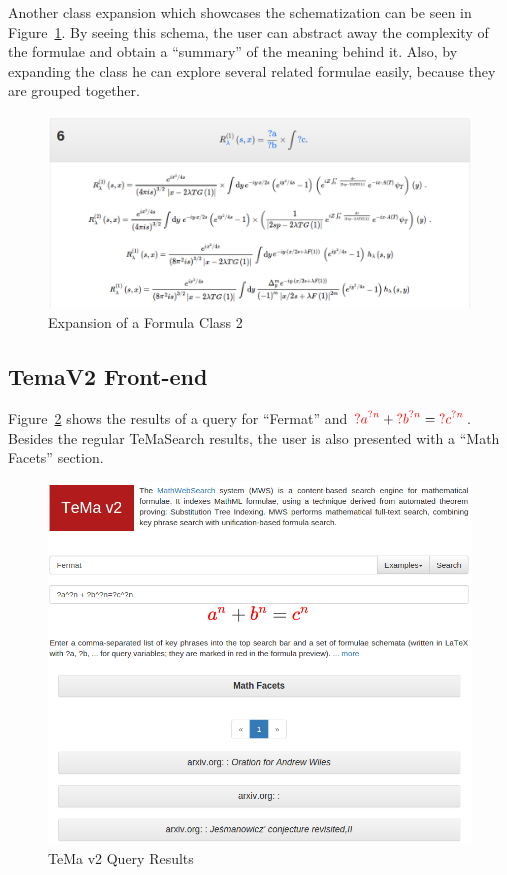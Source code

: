 \documentclass[a4paper,oneside]{article}
\def\red#1{\textcolor{red}{#1}}
\def\tms{\textsf{TeMaSearch}\xspace}
\begin{document}
Another class expansion which showcases the schematization can be seen in
Figure~\ref{fig:schema_instantiation3}. By seeing this schema, the user can
abstract away the complexity of the formulae and obtain a ``summary'' of the
meaning behind it. Also, by expanding the class he can explore several related
formulae easily, because they are grouped together.
\begin{figure}[ht]\centering
    \includegraphics[width=12.1cm]{img/schemaInstGood3.png}
    \caption{Expansion of a Formula Class 2}\label{fig:schema_instantiation3}
\end{figure}
\FloatBarrier

\subsection{TemaV2 Front-end}\label{subsec:fe_results_display2}
Figure~\ref{fig:temaV2_results} shows the results of a query for ``Fermat'' and
${\red{?a}}^{\red{?n}} + {\red{?b}}^{\red{?n}}={\red{?c}}^{\red{?n}}$. Besides
the regular \tms results, the user is also presented with a ``Math Facets''
section.

\begin{figure}[ht]\centering
    \includegraphics[width=12.1cm]{img/temaV2_results.png}
    \caption{TeMa v2 Query Results}\label{fig:temaV2_results}
\end{figure}
\FloatBarrier
\end{document}
